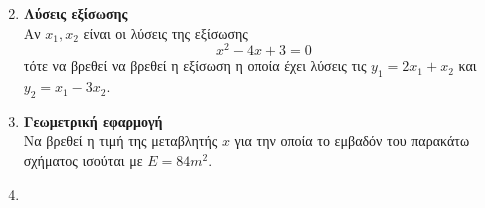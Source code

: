 \documentclass[twoside,nofonts,internet]{askhseis}
\begin{document}
\begin{enumerate}
\begin{multicols}{2}
\end{multicols}
\item \textbf{Λύσεις εξίσωσης}\\
Αν $ x_1,x_2 $ είναι οι λύσεις της εξίσωσης \[ x^2-4x+3=0 \] τότε να βρεθεί να βρεθεί η εξίσωση η οποία έχει λύσεις τις $ y_1=2x_1+x_2 $ και $ y_2=x_1-3x_2 $.
\item \textbf{Γεωμετρική εφαρμογή}\\
Να βρεθεί η τιμή της μεταβλητής $ x $ για την οποία το εμβαδόν του παρακάτω σχήματος ισούται με $ E=84m^2 $.
\begin{center}
\end{center}
\item 
\end{enumerate}
\end{document}
